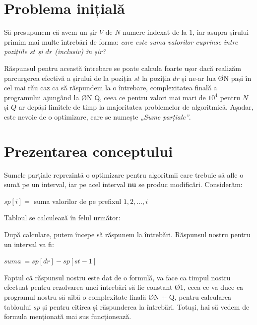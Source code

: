 
\section{Problema inițială}

Să presupunem că avem un șir $V$ de $N$ numere indexat de la $1$, iar asupra șirului primim mai multe întrebări de forma: \emph{care este suma valorilor cuprinse între pozițiile $st$ și $dr$ (inclusiv) în șir?}

Răspunsul pentru această întrebare se poate calcula foarte ușor dacă realizăm parcurgerea efectivă a șirului de la poziția $st$ la poziția $dr$ și ne-ar lua \O{N} pași în cel mai rău caz ca să răspundem la o întrebare, complexitatea finală a programului ajungând la \O{N \cdot Q}, ceea ce pentru valori mai mari de $10^4$ pentru $N$ și $Q$ ar depăși limitele de timp la majoritatea problemelor de algoritmică. Așadar, este nevoie de o optimizare, care se numește \emph{„Sume parțiale”}.

\section{Prezentarea conceptului}

Sumele parțiale reprezintă o optimizare pentru algoritmii care trebuie să afle o sumă pe un interval, iar pe acel interval \textbf{nu} se produc modificări. Considerăm:

\begin{center}
    $sp[i] =$ suma valorilor de pe prefixul $1, 2, \dots, i$
\end{center}

Tabloul se calculează în felul următor:


După calculare, putem începe să răspunem la întrebări. Răspunsul nostru pentru un interval va fi:

\begin{center}
    $suma \ = sp[dr] - sp[st - 1]$
\end{center}

Faptul că răspunsul nostru este dat de o formulă, va face ca timpul nostru efectuat pentru rezolvarea unei întrebări să fie constant \O{1}, ceea ce va duce ca programul nostru să aibă o complexitate finală \O{N + Q}, pentru calcularea tabloului $sp$ și pentru citirea și răspunderea la întrebări. Totuși, hai să vedem de formula menționată mai sus funcționează. 

